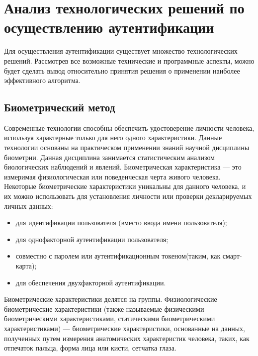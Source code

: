 \section{Анализ технологических решений по осуществлению аутентификации}

Для осуществления аутентификации существует множество технологических решений.
Рассмотрев все возможные технические и программные аспекты, можно будет сделать
вывод относительно принятия решения о применении наиболее эффективного
алгоритма.

\subsection{Биометрический метод}

Современные технологии способны обеспечить удостоверение личности человека,
используя характерные только для него одного характеристики. Данные технологии
основаны на практическом применении знаний научной дисциплины биометрии. Данная
дисциплина занимается статистическим анализом биологических наблюдений и
явлений. Биометрическая характеристика --- это измеримая физиологическая или
поведенческая черта живого человека. Некоторые биометрические характеристики
уникальны для данного человека, и их можно использовать для установления
личности или проверки декларируемых личных данных:
\begin{itemize}
  \item для идентификации пользователя (вместо ввода имени пользователя);
  \item для однофакторной аутентификации пользователя;
  \item совместно с паролем или
аутентификационным токеном(таким, как смарт-карта);
  \item для обеспечения
двухфакторной аутентификации.
\end{itemize}

Биометрические характеристики делятся на группы. Физиологические биометрические
характеристики (также называемые физическими биометрическими характеристиками,
статическими биометрическими характеристиками) --- биометрические
характеристики, основанные на данных, полученных путем измерения анатомических
характеристик человека, таких, как отпечаток пальца, форма лица или кисти,
сетчатка глаза.

